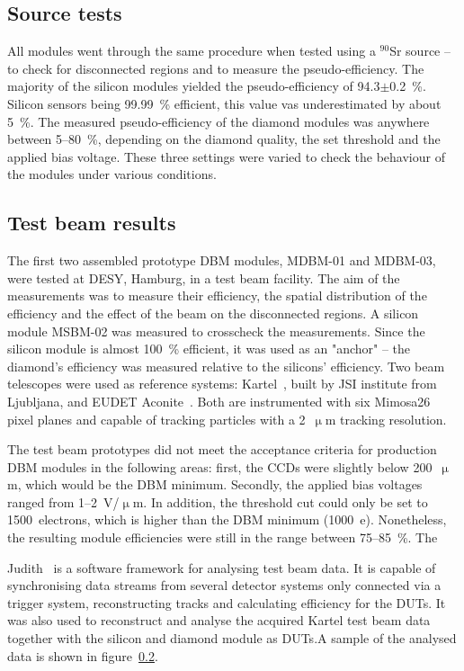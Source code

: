 \documentclass[12pt]{packages/mytustyle}  %
\begin{document}
\subsection{Source tests}
All modules went through the same procedure when tested using a $^{90}$Sr source -- to check for disconnected regions and to measure the pseudo-efficiency. The majority of the silicon modules yielded the pseudo-efficiency of 94.3$\pm$0.2~\%. Silicon sensors being 99.99~\% efficient, this value vas underestimated by about 5~\%. The measured pseudo-efficiency of the diamond modules was anywhere between 5--80~\%, depending on the diamond quality, the set threshold and the applied bias voltage. These three settings were varied to check the behaviour of the modules under various conditions. 
\subsection{Test beam results}
The first two assembled prototype DBM modules, MDBM-01 and MDBM-03, were tested at DESY, Hamburg, in a test beam facility. The aim of the measurements was to measure their efficiency, the spatial distribution of the efficiency and the effect of the beam on the disconnected regions. A silicon module MSBM-02 was measured to crosscheck the measurements. Since the silicon module is almost 100~\% efficient, it was used as an "anchor" -- the diamond's efficiency was measured relative to the silicons' efficiency. Two beam telescopes were used as reference systems: Kartel~\cite{}, built by JSI institute from Ljubljana, and EUDET Aconite~\cite{}. Both are instrumented with six Mimosa26 pixel planes and capable of tracking particles with a 2~$\upmu$m tracking resolution.

The test beam prototypes did not meet the acceptance criteria for production DBM modules in the following areas: first, the CCDs were slightly below 200~$\upmu$m, which would be the DBM minimum. Secondly, the applied bias voltages ranged from 1--2~V/$\upmu$m. In addition, the threshold cut could only be set to 1500~electrons, which is higher than the DBM minimum (1000~e). Nonetheless, the resulting module efficiencies were still in the range between 75--85~\%. The 

Judith~\cite{} is a software framework for analysing test beam data. It is capable of synchronising data streams from several detector systems only connected via a trigger system, reconstructing tracks and calculating efficiency for the DUTs. It was also used to reconstruct and analyse the acquired Kartel test beam data together with the silicon and diamond module as DUTs.A sample of the analysed data is shown in figure~\ref{}. 
\end{document}
